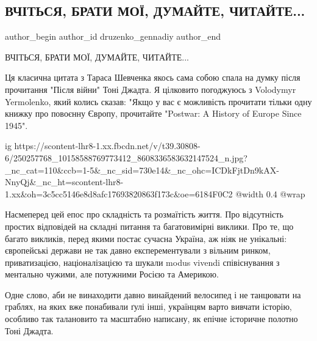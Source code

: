  
 
 
 
 
 
\subsection{ВЧІТЬСЯ, БРАТИ МОЇ, ДУМАЙТЕ, ЧИТАЙТЕ...}
\label{sec:31_10_2021.fb.druzenko_gennadiy.1.shevchenko_patriotizm_gejne}
 
\ifcmt
 author_begin
   author_id druzenko_gennadiy
 author_end
\fi

ВЧІТЬСЯ, БРАТИ МОЇ, ДУМАЙТЕ, ЧИТАЙТЕ...

Ця класична цитата з Тараса Шевченка якось сама собою спала на думку після
прочитання "Після війни" Тоні Джадта. Я цілковито погоджуюсь з Volodymyr
Yermolenko, який колись сказав: "Якщо у вас є можливість прочитати тільки одну
книжку про повоєнну Європу, прочитайте "Postwar: A History of Europe Since
1945". 

\ifcmt
  ig https://scontent-lhr8-1.xx.fbcdn.net/v/t39.30808-6/250257768_10158588769773412_8608336583632147524_n.jpg?_nc_cat=110&ccb=1-5&_nc_sid=730e14&_nc_ohc=ICDkFjtDn9kAX-NnyQj&_nc_ht=scontent-lhr8-1.xx&oh=3c5cc5146e8d8afc17693820863f173c&oe=6184F0C2
  @width 0.4
  @wrap 
\fi

Насмеперед цей епос про складність та розмаїтість життя. Про відсутність
простих відповідей на складні питання та багатовимірні виклики. Про те, що
багато викликів, перед якими постає сучасна Україна, аж ніяк не унікальні:
європейські держави не так давно експерементували з вільним ринком,
приватизацією, націоналізацією та шукали modus vivendi співіснування з
ментально чужими, але потужними Росією та Америкою. 

Одне слово, аби не винаходити давно винайдений велосипед і не танцювати на
граблях, на яких вже понабивали ґулі інші, українцям варто вивчати історію,
особливо так талановито та масштабно написану, як епічне історичне полотно Тоні
Джадта.

